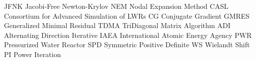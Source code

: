 \makeglossaries

    {JFNK}    {Jacobi-Free Newton-Krylov}
     {NEM}     {Nodal Expansion Method}
    {CASL}    {Consortium for Advanced Simulation of LWRs}
      {CG}      {Conjugate Gradient}
   {GMRES}   {Generalized Minimal Residual}
    {TDMA}    {TriDiagonal Matrix Algorithm}
     {ADI}     {Alternating Direction Iterative}
    {IAEA}    {International Atomic Energy Agency}
     {PWR}     {Pressurized Water Reactor}
     {SPD}     {Symmetric Positive Definite}
      {WS}      {Wielandt Shift}
      {PI}      {Power Iteration}
